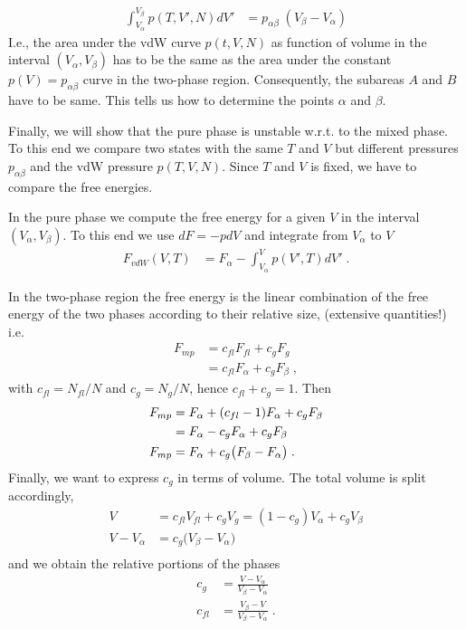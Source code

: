 %
\begin{align}\label{eq:aux:vdW}
 \int_{V_{\alpha}}^{V_{\beta}} p(T,V',N)  dV' &=
 p_{\alpha\beta}\;(V_{\beta}-V_{\alpha})
\end{align}
%
I.e., the area under the vdW curve $p(t,V,N)$ as function of volume in the interval  $(V_{\alpha},V_{\beta})$
has to be the same as the area under the constant  $p(V)=p_{\alpha\beta}$ curve in the two-phase region. Consequently, the subareas $A$ and $B$ have to be same.
This tells us how to determine the points $\alpha$ and $\beta$.

Finally, we will show that the pure phase is unstable w.r.t. to the mixed phase. To this end we compare two states with the same $T$ and $V$ but different pressures $p_{\alpha\beta}$
and the vdW pressure $p(T,V,N)$. Since $T$ and $V$ is fixed, we have to compare the free energies.

In the pure phase we compute the free energy for a given $V$ in the interval $(V_{\alpha},V_{\beta})$. To this end we use $dF=-pdV$ and integrate from $V_{\alpha}$ to $V$
%
\begin{align}\label{eq:F:vdW}
F_{vdW}(V,T) &= F_{\alpha} - \int_{V_{\alpha}}^{V} p(V',T) dV'\;.
\end{align}
%



In the two-phase region the free energy is the linear combination of the free energy of the two phases according to their relative size, (extensive quantities!) i.e. 
%
\begin{align}\label{eq:}
F_{mp} &=  c_{fl} F_{fl} + c_{g} F_{g}\\
 &=  c_{fl} F_{\alpha} + c_{g} F_{\beta}\;,
\end{align}
%
with $c_{fl}=N_{fl}/N$ and $c_{g}=N_{g}/N$, hence $c_{fl}+c_{g}=1$\;.
Then
\begin{align}
F_{mp} &=  F_{\alpha}+ (c_{fl}-1) F_{\alpha} + c_{g} F_{\beta}\notag\\
 &=  F_{\alpha}- c_{g} F_{\alpha} + c_{g} F_{\beta}\notag\\
F_{mp}  &=  F_{\alpha}+  c_{g} \big(F_{\beta}-F_{\alpha}\big)\label{eq:F:mp:a}\;.
\end{align}
%
Finally, we want  to express $c_{g}$ in terms of volume. The total volume is split accordingly,
%
\begin{align*}
V &= c_{fl} V_{fl} + c_{g} V_{g} = (1-c_{g}) V_{\alpha} + c_{g} V_{\beta} \\
V-V_{\alpha} &= c_{g} \big(V_{\beta}-V_{\alpha}  \big)\\
\end{align*}
%
and we obtain the relative portions of the phases
%
\begin{subequations}\label{eq:rel:port:phase}
\begin{align}
c_{g} &= \frac{V-V_{\alpha} }{V_{\beta}-V_{\alpha} }\\
c_{fl} &=\frac{V_{\beta}-V }{V_{\beta}-V_{\alpha} }\;.
\end{align}
\end{subequations}


